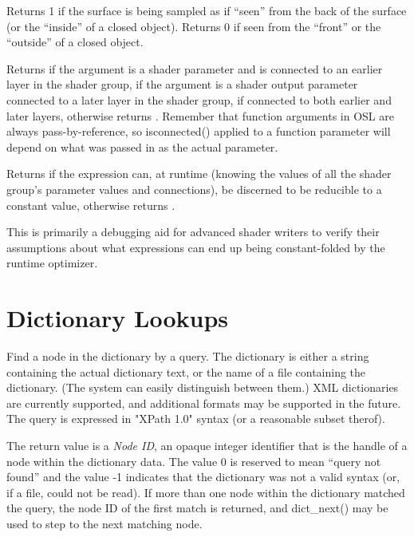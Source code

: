 \documentclass[11pt,letterpaper]{book}
\begin{document}
Returns 1 if the surface is being sampled as if ``seen'' from the back
of the surface (or the ``inside'' of a closed object). Returns 0 if seen
from the ``front'' or the ``outside'' of a closed object.
\apiend

Returns {} if the argument is a shader parameter and is connected
to an earlier layer in the shader group, 
{} if the argument is a shader output parameter connected
to a later layer in the shader group, {} if connected to both
earlier and later layers, otherwise returns {}.
Remember that function arguments in OSL are always pass-by-reference,
so {\cf isconnected()} applied to a function parameter will depend on
what was passed in as the actual parameter.
\apiend

Returns {} if the expression can, at runtime (knowing the values of all
the shader group's parameter values and connections), be discerned to be
reducible to a constant value, otherwise returns {}.

This is primarily a debugging aid for advanced shader writers to verify
their assumptions about what expressions can end up being constant-folded
by the runtime optimizer.
\apiend


\section{Dictionary Lookups}
\label{sec:stdlib:dictionaries}

    Find a node in the dictionary by a query.  The {\cf dictionary} is
    either a string containing the actual dictionary text, or the name
    of a file containing the dictionary.  (The system can easily
    distinguish between them.)  XML dictionaries are currently
    supported, and additional formats may be supported in the future.
    The query is expressed in "XPath 1.0" syntax (or a reasonable subset
    therof).

    The return value is a \emph{Node ID}, an opaque integer identifier
    that is the handle of a node within the dictionary data.  The value
    0 is reserved to mean ``query not found'' and the value -1 indicates
    that the dictionary was not a valid syntax (or, if a file, could not
    be read).  If more than one node within
    the dictionary matched the query, the node ID of the first match is
    returned, and {\cf dict_next()} may be used to step to the next
    matching node.
\end{document}
